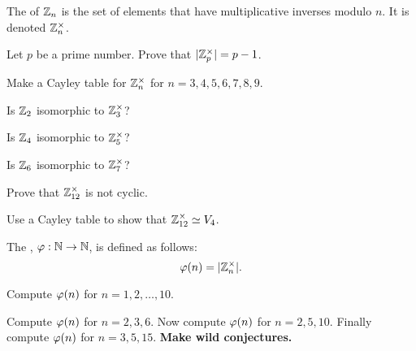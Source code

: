 \documentclass{ximera}
\begin{document}
\begin{definition}
  The  of $\mathbb Z_n$ is the set of elements that
  have multiplicative inverses modulo $n$. It is denoted
  $\mathbb Z_n^\times$.
\end{definition}


\begin{exercise}
  Let $p$ be a prime number. Prove that $|\mathbb Z_p^\times| = p-1$.
\end{exercise}


\begin{exercise}
  Make a Cayley table for $\mathbb Z_n^\times$ for $n = 3,4,5,6,7,8,9$.
\end{exercise}

\begin{exercise}
  Is $\mathbb Z_2$ isomorphic to $\mathbb Z_3^\times$?
\end{exercise}


\begin{exercise}
  Is $\mathbb Z_4$ isomorphic to $\mathbb Z_5^\times$?
\end{exercise}

\begin{exercise}
  Is $\mathbb Z_6$ isomorphic to $\mathbb Z_7^\times$?
\end{exercise}


\begin{exercise}
  Prove that $\mathbb Z_{12}^\times$ is not cyclic.
\end{exercise}

\begin{exercise}
  Use a Cayley table to show that $\mathbb Z^\times_{12}\simeq V_4$.
\end{exercise}


\begin{definition}
  The , $\eulerphi:\N\to\N$, is defined as
  follows:
  \[
  \eulerphi(n) = |\Z_n^\times|.
  \]
\end{definition}


\begin{exercise}
  Compute $\eulerphi(n)$ for $n = 1,2,\dots, 10$.
\end{exercise}




\begin{exercise}
  Compute $\eulerphi(n)$ for $n = 2,3,6$. Now compute $\eulerphi(n)$
  for $n = 2,5,10$. Finally compute $\eulerphi(n)$ for $n=
  3,5,15$. \textbf{Make wild conjectures.}
\end{exercise}
\end{document}
